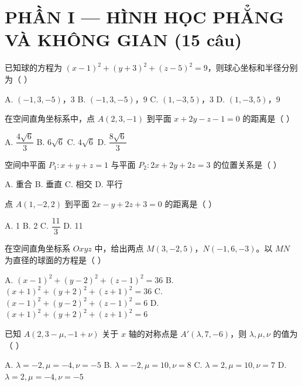 \documentclass[11pt, a4paper]{article}
\begin{document}

\section{PHẦN I — HÌNH HỌC PHẲNG VÀ KHÔNG GIAN (15 câu)}

\begin{baitap}[1]
已知球的方程为 $(x-1)^2 + (y+3)^2 + (z-5)^2 = 9$，则球心坐标和半径分别为（ ）
\par\vspace{3pt}
\noindent A. $(-1,3,-5)$，$3$ \quad B. $(-1,3,-5)$，$9$ \quad C. $(1,-3,5)$，$3$ \quad D. $(1,-3,5)$，$9$
\end{baitap}

\begin{baitap}[2]
在空间直角坐标系中，点 $A(2,3,-1)$ 到平面 $x + 2y - z - 1 = 0$ 的距离是（ ）
\par\vspace{3pt}
\noindent A. $\dfrac{4\sqrt{6}}{3}$ \quad B. $6\sqrt{6}$ \quad C. $4\sqrt{6}$ \quad D. $\dfrac{8\sqrt{6}}{3}$
\end{baitap}

\begin{baitap}[3]
空间中平面 $P_1: x + y + z = 1$ 与平面 $P_2: 2x + 2y + 2z = 3$ 的位置关系是（ ）
\par\vspace{3pt}
\noindent A. 重合 \quad B. 垂直 \quad C. 相交 \quad D. 平行
\end{baitap}

\begin{baitap}[4]
点 $A(1,-2,2)$ 到平面 $2x - y + 2z + 3 = 0$ 的距离是（ ）
\par\vspace{3pt}
\noindent A. 1 \quad B. 2 \quad C. $\dfrac{11}{3}$ \quad D. 11
\end{baitap}

\begin{baitap}[5]
在空间直角坐标系 $Oxyz$ 中，给出两点 $M(3,-2,5)$，$N(-1,6,-3)$。以 $MN$ 为直径的球面的方程是（ ）
\par\vspace{3pt}
\noindent A. $(x-1)^2 + (y-2)^2 + (z-1)^2 = 36$ \quad B. $(x+1)^2 + (y+2)^2 + (z+1)^2 = 36$ \quad C. $(x-1)^2 + (y-2)^2 + (z-1)^2 = 6$ \quad D. $(x+1)^2 + (y+2)^2 + (z+1)^2 = 6$
\end{baitap}

\begin{baitap}[6]
已知 $A(2, 3-\mu, -1+\nu)$ 关于 $x$ 轴的对称点是 $A'(\lambda, 7, -6)$，则 $\lambda, \mu, \nu$ 的值为（ ）
\par\vspace{3pt}
\noindent A. $\lambda = -2, \mu = -4, \nu = -5$ \quad B. $\lambda = -2, \mu = 10, \nu = 8$ \quad C. $\lambda = 2, \mu = 10, \nu = 7$ \quad D. $\lambda = 2, \mu = -4, \nu = -5$
\end{baitap}
\end{document}

